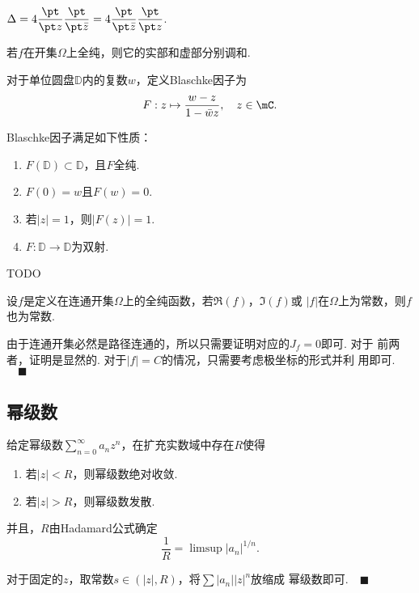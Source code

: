   \begin{pos}
    $\Delta = 4\dfrac{\pt}{\pt z}\dfrac{\pt}{\pt\bar{z}}
    = 4\dfrac{\pt}{\pt\bar{z}}\dfrac{\pt}{\pt z}$.
  \end{pos}

  \begin{cor}[调和]
    若$f$在开集$\Omega$上全纯，则它的实部和虚部分别调和.
  \end{cor}

  \begin{defi}[Blaschke因子]
    对于单位圆盘$\mathbb{D}$内的复数$w$，定义Blaschke因子为
    \[
      F: z\mapsto \frac{w-z}{1-\bar{w}z},\quad z\in\mC.
    \]
  \end{defi}

  \begin{thm}[Blaschke因子]
    Blaschke因子满足如下性质：
    \begin{enumerate}
      \item $F(\mathbb{D})\subset\mathbb{D}$，且$F$全纯.
      \item $F(0)=w$且$F(w)=0$.
      \item 若$|z|=1$，则$|F(z)|=1$.
      \item $F:\mathbb{D}\to\mathbb{D}$为双射.
    \end{enumerate}
  \end{thm}
  \proof
    TODO

  \begin{pos}[常数]
    设$f$是定义在连通开集$\Omega$上的全纯函数，若$\Re(f)$，$\Im(f)$或
    $|f|$在$\Omega$上为常数，则$f$也为常数.
  \end{pos}
  \proof
    由于连通开集必然是路径连通的，所以只需要证明对应的$J_f=0$即可. 对于
    前两者，证明是显然的. 对于$|f|=C$的情况，只需要考虑极坐标的形式并利
    用即可.$\quad\blacksquare$

\subsection{幂级数}

  \begin{thm}[幂级数收敛半径]
    给定幂级数$\sum_{n=0}^\infty a_nz^n$，在扩充实数域中存在$R$使得
    \begin{enumerate}
      \item 若$|z|<R$，则幂级数绝对收敛.
      \item 若$|z|>R$，则幂级数发散.
    \end{enumerate}
    并且，$R$由Hadamard公式确定
    \[
      \frac{1}{R} = \limsup|a_n|^{1/n}.
    \]
  \end{thm}
  \proof
    对于固定的$z$，取常数$s\in(|z|, R)$，将$\sum|a_n||z|^n$放缩成
    幂级数即可.$\quad\blacksquare$

